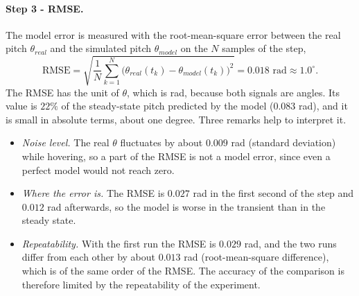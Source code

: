 \paragraph{Step 3 - RMSE.}
The model error is measured with the root-mean-square error between the real pitch $\theta_{real}$ and the simulated pitch $\theta_{model}$ on the $N$ samples of the step,
\begin{equation*}
\text{RMSE} = \sqrt{\frac{1}{N} \sum_{k=1}^{N} \big( \theta_{real}(t_k) - \theta_{model}(t_k) \big)^2 } = 0.018 \text{ rad} \approx 1.0^\circ .
\end{equation*}
The RMSE has the unit of $\theta$, which is rad, because both signals are angles.
Its value is $22\%$ of the steady-state pitch predicted by the model ($0.083$ rad), and it is small in absolute terms, about one degree.
Three remarks help to interpret it.
\begin{itemize}
\item \emph{Noise level.} The real $\theta$ fluctuates by about $0.009$ rad (standard deviation) while hovering, so a part of the RMSE is not a model error, since even a perfect model would not reach zero.
\item \emph{Where the error is.} The RMSE is $0.027$ rad in the first second of the step and $0.012$ rad afterwards, so the model is worse in the transient than in the steady state.
\item \emph{Repeatability.} With the first run the RMSE is $0.029$ rad, and the two runs differ from each other by about $0.013$ rad (root-mean-square difference), which is of the same order of the RMSE.
The accuracy of the comparison is therefore limited by the repeatability of the experiment.
\end{itemize}


